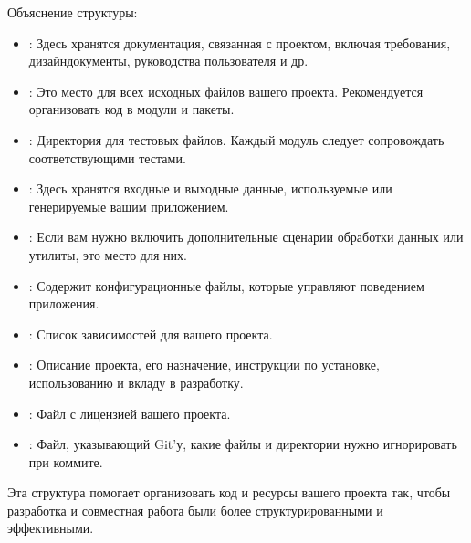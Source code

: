 \documentclass[letterpaper,10pt,russian]{sphinxmanual}
\begin{document}
\sphinxAtStartPar
Объяснение структуры:
\begin{itemize}
\item {} 
\sphinxAtStartPar
{}: Здесь хранятся документация, связанная с проектом, включая требования, дизайн\sphinxhyphen{}документы, руководства пользователя и др.

\item {} 
\sphinxAtStartPar
{}: Это место для всех исходных файлов вашего проекта. Рекомендуется организовать код в модули и пакеты.

\item {} 
\sphinxAtStartPar
{}: Директория для тестовых файлов. Каждый модуль следует сопровождать соответствующими тестами.

\item {} 
\sphinxAtStartPar
{}: Здесь хранятся входные и выходные данные, используемые или генерируемые вашим приложением.

\item {} 
\sphinxAtStartPar
{}: Если вам нужно включить дополнительные сценарии обработки данных или утилиты, это место для них.

\item {} 
\sphinxAtStartPar
{}: Содержит конфигурационные файлы, которые управляют поведением приложения.

\item {} 
\sphinxAtStartPar
{}: Список зависимостей для вашего проекта.

\item {} 
\sphinxAtStartPar
{}: Описание проекта, его назначение, инструкции по установке, использованию и вкладу в разработку.

\item {} 
\sphinxAtStartPar
{}: Файл с лицензией вашего проекта.

\item {} 
\sphinxAtStartPar
{}: Файл, указывающий Git’у, какие файлы и директории нужно игнорировать при коммите.

\end{itemize}

\sphinxAtStartPar
Эта структура помогает организовать код и ресурсы вашего проекта так, чтобы разработка и совместная работа были более структурированными и эффективными.
\end{document}
